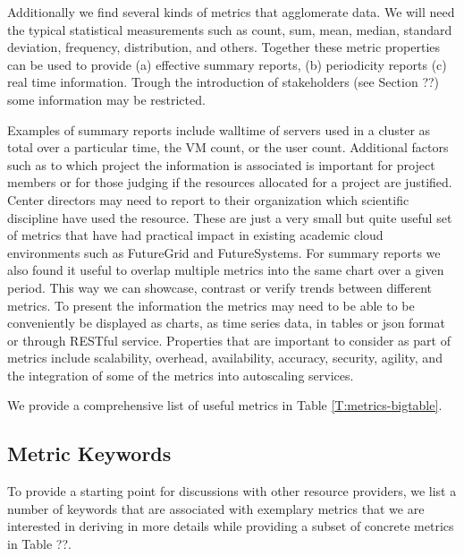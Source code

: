 \documentclass{sig-alternate-05-2015}
\begin{document}
Additionally we find several kinds of metrics that agglomerate
data. We will need the typical statistical measurements such as count,
sum, mean, median, standard deviation, frequency, distribution, and
others. Together these metric properties can be used to provide (a)
effective summary reports, (b) periodicity reports (c) real time
information. Trough the introduction of stakeholders (see Section ??)
some information may be restricted.

Examples of summary reports include walltime of servers used in a
cluster as total over a particular time, the VM count, or the user
count. Additional factors such as to which project the information is
associated is important for project members or for those judging if
the resources allocated for a project are justified. Center directors
may need to report to their organization which scientific discipline
have used the resource. These are just a very small but quite useful
set of metrics that have had practical impact in existing academic
cloud environments such as FutureGrid and FutureSystems.  For summary
reports we also found it useful to overlap multiple metrics into the
same chart over a given period. This way we can showcase, contrast or
verify trends between different metrics.  To present the information
the metrics may need to be able to be conveniently be displayed as
charts, as time series data, in tables or json format or through
RESTful service.  Properties that are important to consider as part of
metrics include scalability, overhead, availability, accuracy,
security, agility, and the integration of some of the metrics into
autoscaling services.

We provide a comprehensive list of useful metrics in Table \ref{T:metrics-bigtable}.

\subsection{Metric Keywords}

To provide a starting point for discussions with other resource
providers, we list a number of keywords that are associated with
exemplary metrics that we are interested in deriving in more details
while providing a subset of concrete metrics in Table ??.
\end{document}
